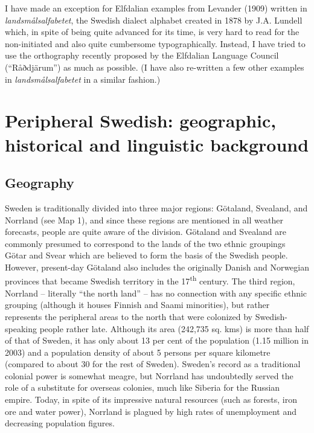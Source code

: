 I have made an exception for Elfdalian examples from Levander (1909) written in \textit{landsmålsalfabetet}, the Swedish dialect alphabet created in 1878 by J.A. Lundell which, in spite of being quite advanced for its time, is very hard to read for the non-initiated and also quite cumbersome typographically. Instead, I have tried to use the orthography recently proposed by the Elfdalian Language Council (“Råðdjärum”) as much as possible. (I have also re-written a few other examples in \textit{landsmålsalfabetet }in a similar fashion.)

\section[Peripheral Swedish: geographic, historical and linguistic background]{\rmfamily Peripheral Swedish: geographic, historical and linguistic background}
\subsection[Geography]{\rmfamily Geography}
Sweden is traditionally divided into three major regions: Götaland, Svealand, and Norrland (see Map 1), and since these regions are mentioned in all weather forecasts, people are quite aware of the division. Götaland and Svealand are commonly presumed to correspond to the lands of the two ethnic groupings Götar and Svear which are believed to form the basis of the Swedish people.  However, present-day Götaland also includes the originally Danish and Norwegian provinces that became Swedish territory in the 17\textsuperscript{th} century. The third region, Norrland – literally “the north land” – has no connection with any specific ethnic grouping (although it houses Finnish and Saami minorities), but rather represents the peripheral areas to the north that were colonized by Swedish-speaking people rather late. Although its area (242,735 sq. kms) is more than half of that of Sweden, it has only about 13 per cent of the population (1.15 million in 2003) and a population density of about 5 persons per square kilometre (compared to about 30 for the rest of Sweden). Sweden’s record as a traditional colonial power is somewhat meagre, but Norrland has undoubtedly served the role of a substitute for overseas colonies, much like Siberia for the Russian empire. Today, in spite of its impressive natural resources (such as forests, iron ore and water power), Norrland is plagued by high rates of unemployment and decreasing population figures. 

